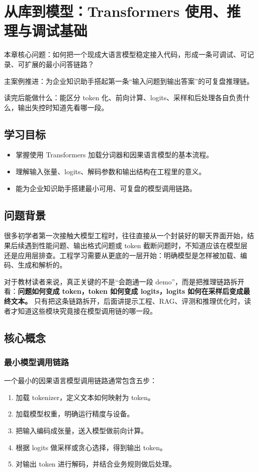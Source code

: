 \chapter{从库到模型：Transformers 使用、推理与调试基础}

\begin{introduction}
\item {\heiti 本章核心问题}：如何把一个现成大语言模型稳定接入代码，形成一条可调试、可记录、可扩展的最小问答链路？
\item {\heiti 主案例推进}：为企业知识助手搭起第一条“输入问题到输出答案”的可复盘推理链。
\item {\heiti 读完后能做什么}：能区分 token 化、前向计算、logits、采样和后处理各自负责什么，输出失控时知道先看哪一段。
\end{introduction}

\section{学习目标}
\begin{itemize}
  \item 掌握使用 Transformers 加载分词器和因果语言模型的基本流程。
  \item 理解输入张量、logits、解码参数和输出结构在工程里的意义。
  \item 能为企业知识助手搭建最小可用、可复盘的模型调用链路。
\end{itemize}

\section{问题背景}
很多初学者第一次接触大模型工程时，往往直接从一个封装好的聊天界面开始，结果后续遇到性能问题、输出格式问题或 token 截断问题时，不知道应该在模型层还是应用层排查。工程学习需要从更底的一层开始：明确模型是怎样被加载、编码、生成和解析的。

对于教材读者来说，真正关键的不是“会跑通一段 demo”，而是把推理链路拆开看：\textbf{问题如何变成 token，token 如何变成 logits，logits 如何在采样后变成最终文本。} 只有把这条链路拆开，后面讲提示工程、RAG、评测和推理优化时，读者才知道这些模块究竟接在模型调用链的哪一段。

\section{核心概念}
\subsection{最小模型调用链路}
一个最小的因果语言模型调用链路通常包含五步：
\begin{enumerate}
  \item 加载 tokenizer，定义文本如何映射为 token。
  \item 加载模型权重，明确运行精度与设备。
  \item 把输入编码成张量，送入模型做前向计算。
  \item 根据 logits 做采样或贪心选择，得到输出 token。
  \item 对输出 token 进行解码，并结合业务规则做后处理。
\end{enumerate}

